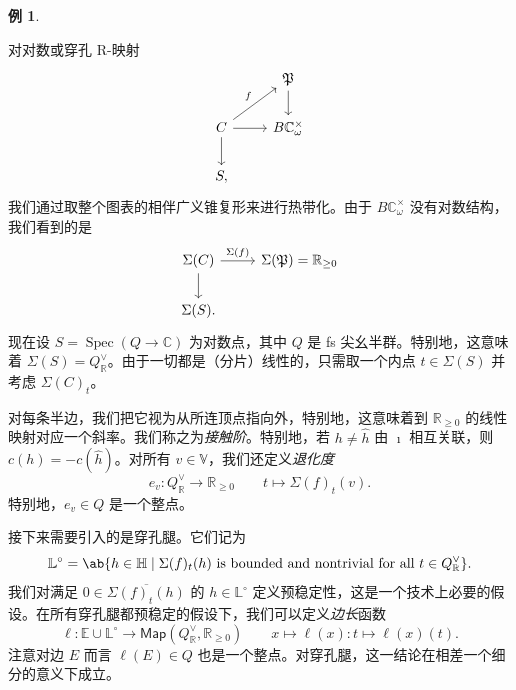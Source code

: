 \documentclass{amsart}
\theoremstyle{definition}
\newtheorem{exm}[thm]{例}
\theoremstyle{remark}
\theoremstyle{plain}
\theoremstyle{definition}
\theoremstyle{remark}
\newcommand{\R}{\mathbb{R}}
\newcommand{\C}{\mathbb{C}}
\newcommand{\E}{\mathbb{E}}
\newcommand{\V}{\mathbb{V}}
\renewcommand{\H}{\mathbb{H}}
\renewcommand{\L}{\mathbb{L}}
\newcommand{\mf}[1]{\mathfrak{#1}}
\newcommand{\ms}[1]{\mathsf{#1}}
\newcommand{\ol}[1]{\overline{#1}}
\newcommand{\1}{\mathbf{1}}
\newcommand{\2}{\mathbf{2}}
\newcommand{\3}{\mathbf{3}}
\DeclareMathOperator{\Spec}{Spec}
\begin{document}
\begin{exm}
\begin{center}
    \end{center}
\end{exm}

对对数或穿孔 R-映射
\begin{equation*}
\begin{tikzcd}
    & \mf{P} \ar{d} \\
    C \ar{ur}{f} \ar{d} \ar{r} & B \C_{\omega}^{\times} \\
    S,
\end{tikzcd}
\end{equation*}
我们通过取整个图表的相伴广义锥复形来进行热带化。由于 \(B \C_{\omega}^{\times}\) 没有对数结构，我们看到的是
\begin{equation*}
\begin{tikzcd}
    \Sigma(C) \ar{d} \ar{r}{\Sigma(f)} & \Sigma(\mf{P}) = \R_{\geq 0} \\
    \Sigma(S).
\end{tikzcd}
\end{equation*}
现在设 \(S = \Spec (Q \to \C)\) 为对数点，其中 \(Q\) 是 fs 尖幺半群。特别地，这意味着 \(\Sigma(S) = Q_{\R}^{\vee}\)。由于一切都是（分片）线性的，只需取一个内点 \(t \in \Sigma(S)\) 并考虑 \(\Sigma(C)_t\)。

对每条半边，我们把它视为从所连顶点指向外，特别地，这意味着到 \(\R_{\geq 0}\) 的线性映射对应一个斜率。我们称之为\textit{接触阶}。特别地，若 \(h \neq \hat{h}\) 由 \(\imath\) 相互关联，则 \(c(h) = - c(\hat{h})\)。对所有 \(v \in \V\)，我们还定义\textit{退化度}
\[ e_v \colon Q_{\R}^{\vee} \to \R_{\geq 0} \qquad t \mapsto \Sigma(f)_t (v). \]
特别地，\(e_v \in Q\) 是一个整点。

接下来需要引入的是穿孔腿。它们记为
\[ \L^{\circ} = \ab\{ h \in \H \mid \Sigma(f)_t(h) \text{ is bounded and nontrivial for all } t \in Q_{\R}^{\vee}\}. \] 
我们对满足 \(0 \in \ol{\Sigma(f)_t(h)}\) 的 \(h \in \L^{\circ}\) 定义预稳定性，这是一个技术上必要的假设。在所有穿孔腿都预稳定的假设下，我们可以定义\textit{边长}函数
\[ \ell \colon \E \cup \L^{\circ} \to \ms{Map}(Q_{\R}^{\vee}, \R_{\geq 0}) \qquad x \mapsto \ell(x) \colon t \mapsto \ell(x)(t). \]
注意对边 \(E\) 而言 \(\ell(E) \in Q\) 也是一个整点。对穿孔腿，这一结论在相差一个细分的意义下成立。
\end{document}
